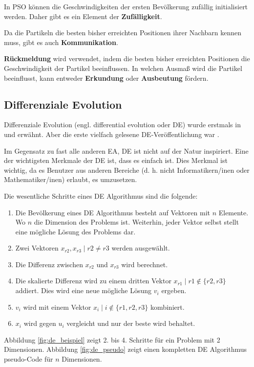 \documentclass[twoside,twocolumn]{article}
\begin{document}
In PSO können die Geschwindigkeiten der ersten Bevölkerung zufällig initialisiert werden. Daher gibt es ein Element der \textbf{Zufälligkeit}.\par
Da die Partikeln die besten bisher erreichten Positionen ihrer Nachbarn kennen muss, gibt es auch \textbf{Kommunikation}.\par
\textbf{Rückmeldung} wird verwendet, indem die besten bisher erreichten Positionen die Geschwindigkeit der Partikel beeinflussen. In welchen Ausmaß wird die Partikel beeinflusst, kann entweder \textbf{Erkundung} oder \textbf{Ausbeutung} fördern.

\subsection{Differenziale Evolution}
Differenziale Evolution (engl. differential evolution oder DE) wurde erstmals in \cite{storn_de_a} und \cite{storn_de_b} erwähnt. Aber die erste vielfach gelesene DE-Veröffentlichung war \cite{price_storn_de}.\par
Im Gegensatz zu fast alle anderen EA, DE ist nicht auf der Natur inspiriert. Eine der wichtigsten Merkmale der DE ist, dass es einfach ist. Dies Merkmal ist wichtig, da es Benutzer aus anderen Bereiche (d. h. nicht Informatikern/inen oder Mathematiker/inen) erlaubt, es umzusetzen.\par
Die wesentliche Schritte eines DE Algorithmus sind die folgende:

\begin{enumerate}
\item Die Bevölkerung eines DE Algorithmus besteht auf Vektoren mit $n$ Elemente. Wo $n$ die Dimension des Problems ist. Weiterhin, jeder Vektor selbst stellt eine mögliche Lösung des Problems dar.
\item Zwei Vektoren $x_{r2}, x_{r3} \mid r2 \neq r3$ werden ausgewählt.
\item Die Differenz zwischen $x_{r2}$ und $x_{r3}$ wird berechnet.
\item Die skalierte Differenz wird zu einem dritten Vektor $x_{r1} \mid r1 \notin \{ r2, r3 \}$ addiert. Dies wird eine neue mögliche Lösung $v_i$ ergeben.
\item $v_i$ wird mit einem Vektor $x_i \mid i \notin \{ r1, r2, r3 \}$ kombiniert.
\item $x_i$ wird gegen $u_i$ vergleicht und nur der beste wird behaltet.
\end{enumerate}

Abbildung \ref{fig:de_beispiel} zeigt 2. bis 4. Schritte für ein Problem mit 2 Dimensionen. Abbildung \ref{fig:de_pseudo} zeigt einen kompletten DE Algorithmus pseudo-Code für $n$ Dimensionen.\par
\end{document}
